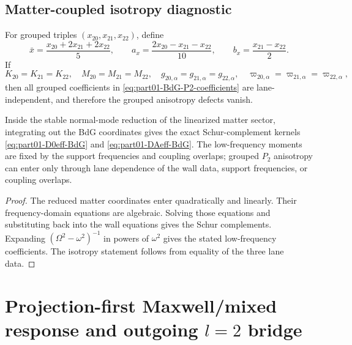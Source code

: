 \subsection{Matter-coupled isotropy diagnostic}
\label{subsec:part01-BdG-isotropy-diagnostic}

For grouped triples \((x_{20},x_{21},x_{22})\), define
\begin{equation}
\label{eq:part01-grouped-bar-a-b-early}
\bar x=\frac{x_{20}+2x_{21}+2x_{22}}5,
\qquad
a_x=\frac{2x_{20}-x_{21}-x_{22}}{10},
\qquad
b_x=\frac{x_{21}-x_{22}}2.
\end{equation}
If
\begin{equation}
K_{20}=K_{21}=K_{22},
\quad
M_{20}=M_{21}=M_{22},
\quad
g_{20,\alpha}=g_{21,\alpha}=g_{22,\alpha},
\quad
\varpi_{20,\alpha}=\varpi_{21,\alpha}=\varpi_{22,\alpha},
\end{equation}
then all grouped coefficients in \eqref{eq:part01-BdG-P2-coefficients} are lane-independent, and therefore the grouped anisotropy defects vanish.

\begin{theorem}
\label{thm:part01-BdG-schur}
Inside the stable normal-mode reduction of the linearized matter sector, integrating out the BdG coordinates gives the exact Schur-complement kernels \eqref{eq:part01-D0eff-BdG} and \eqref{eq:part01-DAeff-BdG}.  The low-frequency moments are fixed by the support frequencies and coupling overlaps; grouped \(P_2\) anisotropy can enter only through lane dependence of the wall data, support frequencies, or coupling overlaps.
\end{theorem}

\begin{proof}
The reduced matter coordinates enter quadratically and linearly.  Their frequency-domain equations are algebraic.  Solving those equations and substituting back into the wall equations gives the Schur complements.  Expanding \((\Omega^2-\omega^2)^{-1}\) in powers of \(\omega^2\) gives the stated low-frequency coefficients.  The isotropy statement follows from equality of the three lane data.
\end{proof}

\section{Projection-first Maxwell/mixed response and outgoing \texorpdfstring{\(l=2\)}{l=2} bridge}
\label{sec:part01_parent_geometry:localized-maxwell-mixed-response-and-outgoing-l-2-}

